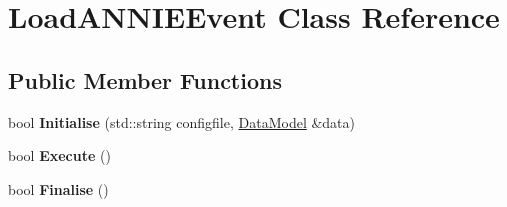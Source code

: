 \hypertarget{classLoadANNIEEvent}{
\section{LoadANNIEEvent Class Reference}
\label{classLoadANNIEEvent}
}
\subsection*{Public Member Functions}
\begin{DoxyCompactItemize}
\item 
\hypertarget{classLoadANNIEEvent_a273ac2b597344b138ff0142fa24bff06}{
bool {\bfseries Initialise} (std::string configfile, \hyperlink{classDataModel}{DataModel} \&data)}
\label{classLoadANNIEEvent_a273ac2b597344b138ff0142fa24bff06}

\item 
\hypertarget{classLoadANNIEEvent_af2c0686e7625d6a8ab5ebd692e78b182}{
bool {\bfseries Execute} ()}
\label{classLoadANNIEEvent_af2c0686e7625d6a8ab5ebd692e78b182}

\item 
\hypertarget{classLoadANNIEEvent_afcee0c0da54733f0c3dadb8c8879f494}{
bool {\bfseries Finalise} ()}
\label{classLoadANNIEEvent_afcee0c0da54733f0c3dadb8c8879f494}

\end{DoxyCompactItemize}
